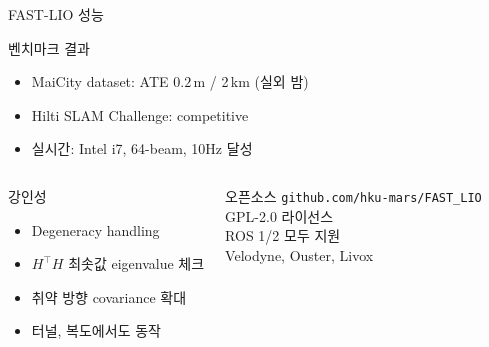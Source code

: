 \begin{frame}{FAST-LIO 성능}
  \begin{block}{벤치마크 결과}
    \begin{itemize}
      \item MaiCity dataset: ATE $0.2\,$m / 2\,km (실외 밤)
      \item Hilti SLAM Challenge: competitive
      \item 실시간: Intel i7, 64-beam, 10Hz 달성
    \end{itemize}
  \end{block}
  \pause
  \begin{columns}
    \begin{block}{강인성}
      \begin{itemize}
        \item Degeneracy handling
        \item $H^\top H$ 최솟값 eigenvalue 체크
        \item 취약 방향 covariance 확대
        \item 터널, 복도에서도 동작
      \end{itemize}
    \end{block}
    \begin{exampleblock}{오픈소스}
      \texttt{github.com/hku-mars/FAST\_LIO}\\
      GPL-2.0 라이선스\\
      ROS 1/2 모두 지원\\
      Velodyne, Ouster, Livox
    \end{exampleblock}
  \end{columns}
\end{frame}

